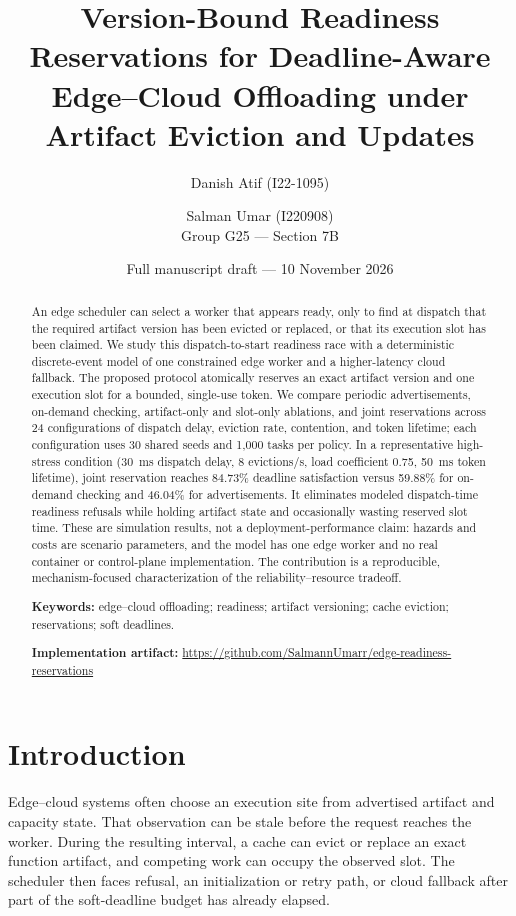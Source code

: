 \documentclass[11pt,a4paper]{article}
\title{Version-Bound Readiness Reservations for Deadline-Aware Edge--Cloud Offloading under Artifact Eviction and Updates}
\author{Danish Atif (I22-1095) \and Salman Umar (I220908)\\Group G25 --- Section 7B}
\date{Full manuscript draft --- 10 November 2026}
\begin{document}
\maketitle

\begin{abstract}
An edge scheduler can select a worker that appears ready, only to find at dispatch that the required artifact version has been evicted or replaced, or that its execution slot has been claimed. We study this dispatch-to-start readiness race with a deterministic discrete-event model of one constrained edge worker and a higher-latency cloud fallback. The proposed protocol atomically reserves an exact artifact version and one execution slot for a bounded, single-use token. We compare periodic advertisements, on-demand checking, artifact-only and slot-only ablations, and joint reservations across 24 configurations of dispatch delay, eviction rate, contention, and token lifetime; each configuration uses 30 shared seeds and 1,000 tasks per policy. In a representative high-stress condition (30~ms dispatch delay, 8 evictions/s, load coefficient 0.75, 50~ms token lifetime), joint reservation reaches 84.73\% deadline satisfaction versus 59.88\% for on-demand checking and 46.04\% for advertisements. It eliminates modeled dispatch-time readiness refusals while holding artifact state and occasionally wasting reserved slot time. These are simulation results, not a deployment-performance claim: hazards and costs are scenario parameters, and the model has one edge worker and no real container or control-plane implementation. The contribution is a reproducible, mechanism-focused characterization of the reliability--resource tradeoff.

\vspace{2pt}
\noindent\textbf{Keywords:} edge--cloud offloading; readiness; artifact versioning; cache eviction; reservations; soft deadlines.

\noindent\textbf{Implementation artifact:} \url{https://github.com/SalmannUmarr/edge-readiness-reservations}
\end{abstract}

\section{Introduction}

Edge--cloud systems often choose an execution site from advertised artifact and capacity state. That observation can be stale before the request reaches the worker. During the resulting interval, a cache can evict or replace an exact function artifact, and competing work can occupy the observed slot. The scheduler then faces refusal, an initialization or retry path, or cloud fallback after part of the soft-deadline budget has already elapsed.
\end{document}
